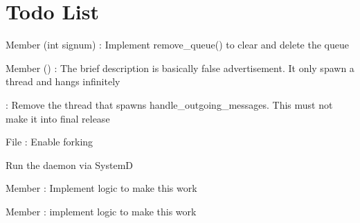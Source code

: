 \chapter{Todo List}
\hypertarget{todo}{}\label{todo}

\begin{DoxyRefList}
\item[Member \doxylink{tcfs__daemon_8c_a93d1097e4dd3c0735da3da2e89410090}{handle\+\_\+termination} (int signum)]\label{todo__todo000006}%
%
\+: Implement remove\+\_\+queue() to clear and delete the queue  
\item[Member \doxylink{tcfs__daemon_8c_ae66f6b31b5ad750f1fe042a706a4e3d4}{main} ()]\label{todo__todo000007}%
%
\+: The brief description is basically false advertisement. It only spawn a thread and hangs infinitely 



\+: Remove the thread that spawns handle\+\_\+outgoing\+\_\+messages. This must not make it into final release  
\item[File \doxylink{tcfs__daemon_8c}{tcfs\+\_\+daemon.c} ]\label{todo__todo000003}%
%
\+: Enable forking 



Run the daemon via SystemD  
\item[Member \doxylink{tcfs__daemon_8c_a679ec79d065ad812032851f6872caee6}{terminate} ]\label{todo__todo000004}%
%
\+: Implement logic to make this work  
\item[Member \doxylink{tcfs__daemon_8c_af7e1db76e3a69a4b0484910b1f7562da}{terminate\+\_\+mutex} ]\label{todo__todo000005}%
%
\+: implement logic to make this work 
\end{DoxyRefList}